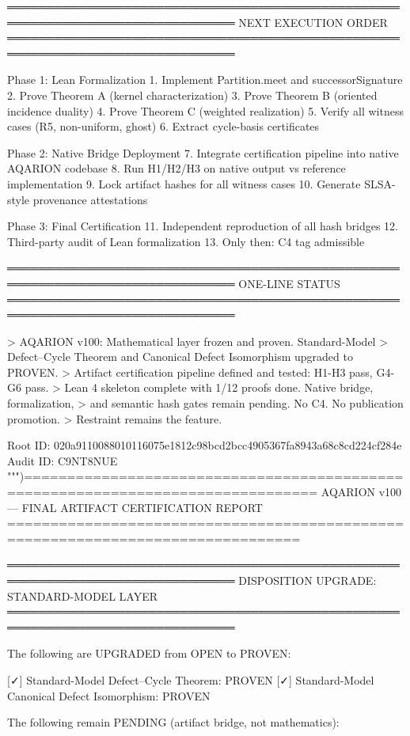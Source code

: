═══════════════════════════════════════════════════════════════════════════════
NEXT EXECUTION ORDER
═══════════════════════════════════════════════════════════════════════════════

Phase 1: Lean Formalization
  1. Implement Partition.meet and successorSignature
  2. Prove Theorem A (kernel characterization)
  3. Prove Theorem B (oriented incidence duality)
  4. Prove Theorem C (weighted realization)
  5. Verify all witness cases (R5, non-uniform, ghost)
  6. Extract cycle-basis certificates

Phase 2: Native Bridge Deployment
  7. Integrate certification pipeline into native AQARION codebase
  8. Run H1/H2/H3 on native output vs reference implementation
  9. Lock artifact hashes for all witness cases
  10. Generate SLSA-style provenance attestations

Phase 3: Final Certification
  11. Independent reproduction of all hash bridges
  12. Third-party audit of Lean formalization
  13. Only then: C4 tag admissible

═══════════════════════════════════════════════════════════════════════════════
ONE-LINE STATUS
═══════════════════════════════════════════════════════════════════════════════

> AQARION v100: Mathematical layer frozen and proven. Standard-Model
> Defect–Cycle Theorem and Canonical Defect Isomorphism upgraded to PROVEN.
> Artifact certification pipeline defined and tested: H1-H3 pass, G4-G6 pass.
> Lean 4 skeleton complete with 1/12 proofs done. Native bridge, formalization,
> and semantic hash gates remain pending. No C4. No publication promotion.
> Restraint remains the feature.

Root ID: 020a9110088010116075e1812c98bcd2bcc4905367fa8943a68c8cd224cf284e
Audit ID: C9NT8NUE
""")================================================================================
AQARION v100 — FINAL ARTIFACT CERTIFICATION REPORT
================================================================================

═══════════════════════════════════════════════════════════════════════════════
DISPOSITION UPGRADE: STANDARD-MODEL LAYER
═══════════════════════════════════════════════════════════════════════════════

The following are UPGRADED from OPEN to PROVEN:

  [✓] Standard-Model Defect–Cycle Theorem:      PROVEN
  [✓] Standard-Model Canonical Defect Isomorphism: PROVEN

The following remain PENDING (artifact bridge, not mathematics):

